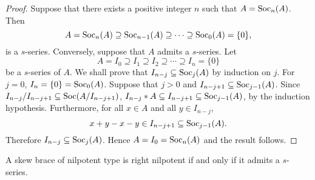 \begin{proof}
    Suppose that there exists a positive integer $n$ such
that $A=\operatorname{Soc}_n(A)$. Then 
\[
A=\operatorname{Soc}_n(A)\supseteq
\operatorname{Soc}_{n-1}(A)\supseteq\cdots\supseteq \operatorname{Soc}_0(A)=\{0\},
\] is a
$s$-series. Conversely, suppose that $A$ admits a $s$-series.
Let 
\[
A=I_0\supseteq I_1\supseteq I_2\supseteq\cdots\supseteq I_n=\{0\}
\]
be a $s$-series of $A$. We shall prove that $I_{n-j}\subseteq
\operatorname{Soc}_{j}(A)$ by induction on $j$. For $j=0$, $I_n=\{0\}=\operatorname{Soc}_0(A)$.
Suppose that $j>0$ and $I_{n-j+1}\subseteq \operatorname{Soc}_{j-1}(A)$. Since
$I_{n-j}/I_{n-j+1}\subseteq \operatorname{Soc}(A/I_{n-j+1})$, $I_{n-j}*A\subseteq
I_{n-j+1}\subseteq \operatorname{Soc}_{j-1}(A)$, by the induction hypothesis.
Furthermore, for all $x\in A$ and all $y\in I_{n-j}$, 
\[
x+y-x-y\in
I_{n-j+1}\subseteq \operatorname{Soc}_{j-1}(A).
\]
Therefore
$I_{n-j}\subseteq\operatorname{Soc}_j(A)$. Hence $A=I_0=\operatorname{Soc}_n(A)$ and the result
follows.
\end{proof}


\begin{proposition}
    \label{pro:right_nilpotent}
    A skew brace of nilpotent type is right nilpotent if and only if it admits a $s$-series.
\end{proposition}

